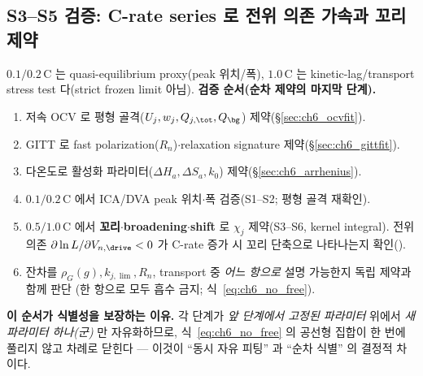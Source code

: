 \subsection{S3--S5 검증: C-rate series 로 전위 의존 가속과 꼬리 제약}\label{sec:ch6_crate}
$0.1/0.2\,\mathrm C$ 는 quasi-equilibrium proxy(peak 위치/폭), $1.0\,\mathrm C$ 는 kinetic-lag/transport stress
test 다(strict frozen limit 아님). \textbf{검증 순서(순차 제약의 마지막 단계).}
\begin{enumerate}[label=C\arabic*),leftmargin=2.4em]
\item 저속 OCV 로 평형 골격($U_j,w_j,Q_{j,\tot},Q_\bg$) 제약(\S\ref{sec:ch6_ocvfit}).
\item GITT 로 fast polarization($R_n$)$\cdot$relaxation signature 제약(\S\ref{sec:ch6_gittfit}).
\item 다온도로 활성화 파라미터($\Delta H_a,\Delta S_a,k_0$) 제약(\S\ref{sec:ch6_arrhenius}).
\item $0.1/0.2\,\mathrm C$ 에서 ICA/DVA peak 위치$\cdot$폭 검증(S1--S2; 평형 골격 재확인).
\item $0.5/1.0\,\mathrm C$ 에서 \textbf{꼬리$\cdot$broadening$\cdot$shift} 로 $\chi_j$ 제약(S3--S6, kernel integral).
  전위 의존 $\partial\ln L/\partial V_{n,\drive}<0$ 가 C-rate 증가 시 꼬리 단축으로 나타나는지 확인().
\item 잔차를 $\rho_G(g),k_{j,\lim},R_n$, transport 중 \emph{어느 항으로} 설명 가능한지 독립 제약과 함께 판단
  (한 항으로 모두 흡수 금지; 식~\eqref{eq:ch6_no_free}).
\end{enumerate}
\textbf{이 순서가 식별성을 보장하는 이유.} 각 단계가 \emph{앞 단계에서 고정된 파라미터} 위에서 \emph{새 파라미터
하나(군)} 만 자유화하므로, 식~\eqref{eq:ch6_no_free} 의 공선형 집합이 한 번에 풀리지 않고 차례로 닫힌다 — 이것이
``동시 자유 피팅'' 과 ``순차 식별'' 의 결정적 차이다.

